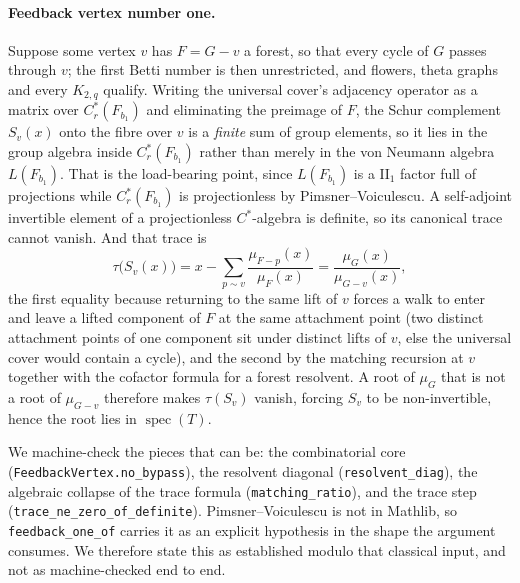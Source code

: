 \documentclass[11pt]{article}
\theoremstyle{remark}
\begin{document}
\paragraph{Feedback vertex number one.}
Suppose some vertex $v$ has $F=G-v$ a forest, so that every cycle of $G$ passes through
$v$; the first Betti number is then unrestricted, and flowers, theta graphs and every
$K_{2,q}$ qualify. Writing the universal cover's adjacency operator as a matrix over
$C^*_r(F_{b_1})$ and eliminating the preimage of $F$, the Schur complement $S_v(x)$ onto
the fibre over $v$ is a \emph{finite} sum of group elements, so it lies in the group
algebra inside $C^*_r(F_{b_1})$ rather than merely in the von Neumann algebra
$L(F_{b_1})$. That is the load-bearing point, since $L(F_{b_1})$ is a $\mathrm{II}_1$
factor full of projections while $C^*_r(F_{b_1})$ is projectionless by Pimsner--Voiculescu.
A self-adjoint invertible element of a projectionless $C^*$-algebra is definite, so its
canonical trace cannot vanish. And that trace is
\[
\tau\bigl(S_v(x)\bigr)=x-\sum_{p\sim v}\frac{\mu_{F-p}(x)}{\mu_F(x)}
=\frac{\mu_G(x)}{\mu_{G-v}(x)} ,
\]
the first equality because returning to the same lift of $v$ forces a walk to enter and
leave a lifted component of $F$ at the same attachment point (two distinct attachment
points of one component sit under distinct lifts of $v$, else the universal cover would
contain a cycle), and the second by the matching recursion at $v$ together with the
cofactor formula for a forest resolvent. A root of $\mu_G$ that is not a root of
$\mu_{G-v}$ therefore makes $\tau(S_v)$ vanish, forcing $S_v$ to be non-invertible, hence
the root lies in $\operatorname{spec}(T)$.

We machine-check the pieces that can be: the combinatorial core
(\texttt{FeedbackVertex.no\_bypass}), the resolvent diagonal
(\texttt{resolvent\_diag}), the algebraic collapse of the trace formula
(\texttt{matching\_ratio}), and the trace step (\texttt{trace\_ne\_zero\_of\_definite}).
Pimsner--Voiculescu is not in Mathlib, so \texttt{feedback\_one\_of} carries it as an
explicit hypothesis in the shape the argument consumes. We therefore state this as
established modulo that classical input, and not as machine-checked end to end.
\end{document}
